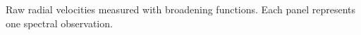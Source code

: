 \label{fig:bffig} Raw radial velocities measured with broadening functions. Each panel represents one spectral observation. 